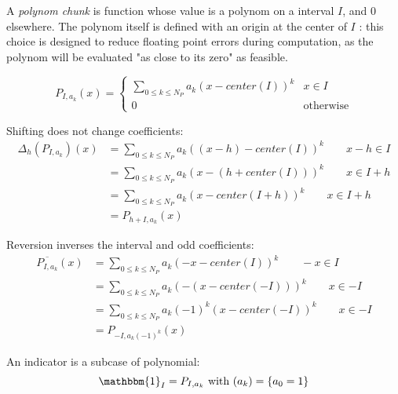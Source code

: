 \documentclass[a4paper,10pt]{article}
\newcommand\Shifted[2]{\Delta_{#1}(#2)}
\newcommand\Reversed[1]{\overline{#1}} %
\newcommand\Indicator[1]{\mathbbm{1}_{#1}}
\newcommand\GridAxis[4]{%
    \draw[very thin,color=gray] (#1,#3) grid (#2,#4);
    \draw[->] (#1,0) -- (#2,0) node[right] {$x$};
    \draw[->] (0,#3) -- (0,#4);
    \node[below right] at (0,0) {$0$};
    \coordinate (Origin) at (0,0);
    \coordinate (FuncStart) at (#1,0);
    \coordinate (FuncEnd) at (#2,0);
}
\newcommand\SizedGridAxis[4]{%
    \GridAxis{#1}{#2}{#3}{#4}
    \node[below right] at (0,1) {$1$};
    \node[below right] at (1,0) {$1$};
}
\begin{document}
A \emph{polynom chunk} is function whose value is a polynom on a interval $I$, and $0$ elsewhere.
The polynom itself is defined with an origin at the center of $I$ : this choice is designed to reduce floating point errors during computation, as the polynom will be evaluated "as close to its zero" as feasible.
\begin{center}\end{center}
\[
    P_{I,a_k}(x) = \begin{cases}
        \sum_{0 \le k \le N_P} a_k (x - \mathit{center}(I))^k & x \in I \\
        0 & \text{otherwise}
    \end{cases}
\]

Shifting does not change coefficients:
\[ \begin{split}
    \Shifted{h}{P_{I,a_k}}(x)
    &= \sum_{0 \le k \le N_P} a_k ((x - h) - \mathit{center}(I))^k \qquad x - h \in I \\
    &= \sum_{0 \le k \le N_P} a_k (x - (h + \mathit{center}(I)))^k \qquad x \in I + h \\
    &= \sum_{0 \le k \le N_P} a_k (x - \mathit{center}(I + h))^k \qquad x \in I + h \\
    &= P_{h+I, a_k}(x)
\end{split} \]

Reversion inverses the interval and odd coefficients:
\[ \begin{split}
    \Reversed{P_{I,a_k}}(x)
    &= \sum_{0 \le k \le N_P} a_k (-x - \mathit{center}(I))^k \qquad -x \in I \\
    &= \sum_{0 \le k \le N_P} a_k (-(x - \mathit{center}(-I)))^k \qquad x \in -I \\
    &= \sum_{0 \le k \le N_P} a_k (-1)^k (x - \mathit{center}(-I))^k \qquad x \in -I \\
    &= P_{-I, a_k (-1)^k}(x)
\end{split} \]

An indicator is a subcase of polynomial:
\[ \Indicator{I} = P_{I, a_k} \text{ with } (a_k) = \{a_0 = 1\} \]
\end{document}
